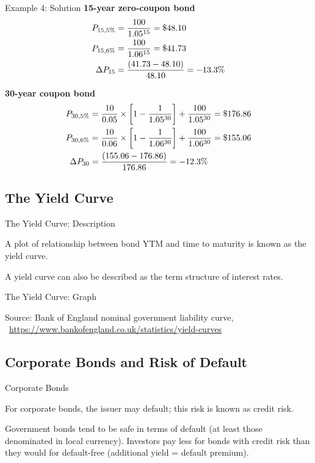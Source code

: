 \documentclass[9pt,aspectratio=169]{beamer}
\newcommand{\keypoint}[1]{%
  \par\noindent
  \begingroup
  \usebeamercolor{keypoint}%
  \setlength{\fboxsep}{7pt}%
  \colorbox{bg}{\parbox{\dimexpr\linewidth-2\fboxsep\relax}{\color{fg}#1}}%
  \endgroup
  \par\medskip}
\begin{document}
\begin{frame}{Example 4: Solution}
\textbf{15-year zero-coupon bond}
\begin{align}\nonumber
P_{15,5\%} &= \frac{100}{1.05^{15}} = \$48.10 \\\nonumber
P_{15,6\%} &= \frac{100}{1.06^{15}} = \$41.73 \\\nonumber
\Delta P_{15} &= \frac{(41.73-48.10)}{48.10} = -13.3\%
\end{align}

\textbf{30-year coupon bond}
\begin{align}\nonumber
P_{30,5\%} &= \frac{10}{0.05} \times \left[1 - \frac{1}{1.05^{30}}\right] + \frac{100}{1.05^{30}} = \$176.86 \\\nonumber
P_{30,6\%} &= \frac{10}{0.06} \times \left[1 - \frac{1}{1.06^{30}}\right] + \frac{100}{1.06^{30}} = \$155.06 \\\nonumber
\Delta P_{30} &= \frac{(155.06-176.86)}{176.86} = -12.3\%
\end{align}
\end{frame}


\subsection{The Yield Curve}
\begin{frame}{The Yield Curve: Description}
\keypoint{A plot of relationship between bond YTM and time to maturity is known as the
yield curve.}

A yield curve can also be described as the term structure of interest rates.
\end{frame}


\begin{frame}{The Yield Curve: Graph}
\begin{center}


\tiny{Source: Bank of England nominal government liability curve, \LCurveDate\ \url{https://www.bankofengland.co.uk/statistics/yield-curves}}
\end{center}
\end{frame}


\subsection{Corporate Bonds and Risk of Default}
\begin{frame}{Corporate Bonds}
\keypoint{For corporate bonds, the issuer may default; this risk is known as credit risk.}

Government bonds tend to be safe in terms of default (at least those denominated in local
currency). Investors pay less for bonds with credit risk than they would for default-free
(additional yield = default premium).
\end{frame}
\end{document}
